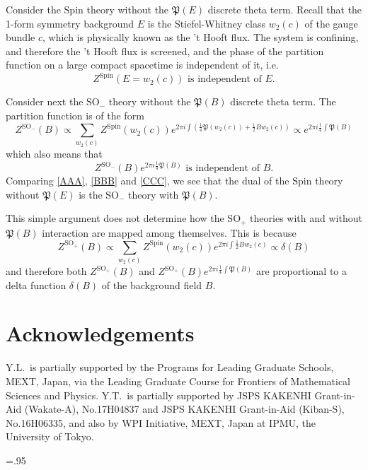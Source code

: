 \documentclass[12pt]{article}
\numberwithin{equation}{section}
\newcommand*{\fP}{\mathfrak{P}}
\def\SO{\mathrm{SO}}
\def\Spin{\mathrm{Spin}}
\begin{document}
Consider the $\Spin$ theory without the $\fP(E)$ discrete theta term.
Recall that the 1-form symmetry background $E$ is the Stiefel-Whitney class $w_2(c)$ of the gauge bundle $c$,
which is physically known as the 't Hooft flux. 
The system is confining, and therefore the 't Hooft flux is screened,
and the phase of the partition function on a large compact spacetime is independent of it, i.e.~
\begin{equation}
\text{$Z^\Spin(E=w_2(c))$ is independent of $E$.}
\label{AAA}
\end{equation}

Consider next the $\SO_-$ theory without the $\fP(B)$ discrete theta term.
The partition function is of the form \begin{equation}
	Z^{\SO_-}(B)\propto \sum_{w_2(c)}  Z^\Spin(w_2(c)) e^{2\pi i \int (\frac14 \mathfrak{P}(w_2(c)) +\frac12 B w_2(c)) }
	 \propto e^{2\pi i \frac14 \int \mathfrak{P}(B)} \label{BBB}
\end{equation} which also means that  \begin{equation}
\text{$Z^{\SO_-}(B) e^{2\pi i \frac14 \mathfrak{P}(B)} $ is independent of $B$.}
\label{CCC}
\end{equation}
Comparing \eqref{AAA}, \eqref{BBB} and \eqref{CCC},
we see that the dual of the $\Spin$ theory without $\fP(E)$ is the $\SO_-$ theory with $\fP(B)$.

This simple argument does not determine how the $\SO_+$ theories with and without $\fP(B)$ interaction are mapped among themselves.
This is because \begin{equation}
	Z^{\SO_+}(B)\propto \sum_{w_2(c)}  Z^\Spin(w_2(c)) e^{2\pi i \int \frac12 B w_2(c) } 
	 \propto \delta(B)
\end{equation} and therefore both $Z^{\SO_+}(B)$ 
and $Z^{\SO_+}(B) e^{2\pi i \frac14 \int \fP(B)}$ 
are proportional to a delta function $\delta(B)$ of the background field $B$.


\section*{Acknowledgements}
Y.L.~is partially supported by the Programs for Leading Graduate Schools, MEXT, Japan, via the Leading Graduate Course for Frontiers of Mathematical Sciences and Physics. 
Y.T.~is partially supported  by JSPS KAKENHI Grant-in-Aid (Wakate-A), No.17H04837 
and JSPS KAKENHI Grant-in-Aid (Kiban-S), No.16H06335,
and also by WPI Initiative, MEXT, Japan at IPMU, the University of Tokyo.


\baselineskip=.95\baselineskip

\end{document}
